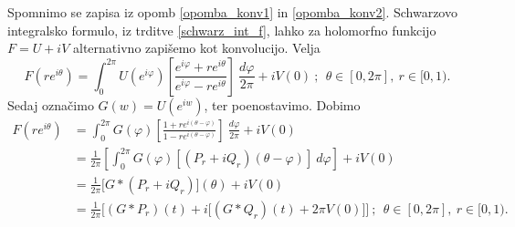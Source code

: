 \documentclass[mat1, tisk]{fmfdelo}
\begin{document}
    \begin{opomba}
        Spomnimo se zapisa iz opomb \ref{opomba_konv1} in \ref{opomba_konv2}. Schwarzovo integralsko formulo, iz trditve \ref{schwarz_int_f}, lahko za holomorfno funkcijo $F = U + iV$ alternativno zapišemo kot konvolucijo. Velja
        $$
            F(r e^{i \theta}) = \int_{0}^{2 \pi}{U(e^{i \varphi})\left[\frac{e^{i \varphi}+r e^{i \theta}}{e^{i \varphi}-r e^{i \theta}}\right]~\frac{d \varphi}{2 \pi}} + i V(0)~;~~\theta \in [0,2 \pi],~r \in [0,1).
        $$
        Sedaj označimo $G(w) = U(e^{iw})$, ter poenostavimo. Dobimo
        \begin{align*}
            F(r e^{i \theta}) & = \int_{0}^{2 \pi}{G(\varphi)\left[\frac{1 +r e^{i (\theta-\varphi)}}{1-r e^{i(\theta-\varphi)}}\right]}~\frac{d\varphi}{2 \pi} + iV(0)\\
            & = \frac{1}{2 \pi} \left[\int_{0}^{2 \pi}{G(\varphi)[(P_r + i Q_r)(\theta - \varphi)]}~d\varphi\right]+  iV(0) \\
            & = \frac{1}{2 \pi} \big[G * (P_r + iQ_r)\big](\theta) + iV(0)\\
            & = \frac{1}{2 \pi}\bigg[(G * P_r)(t) + i\big[(G * Q_r)(t) + 2 \pi V(0)\big]\bigg]~;~~\theta\in [0,2 \pi],~r \in [0,1).
        \end{align*}
    \end{opomba}
\end{document}
